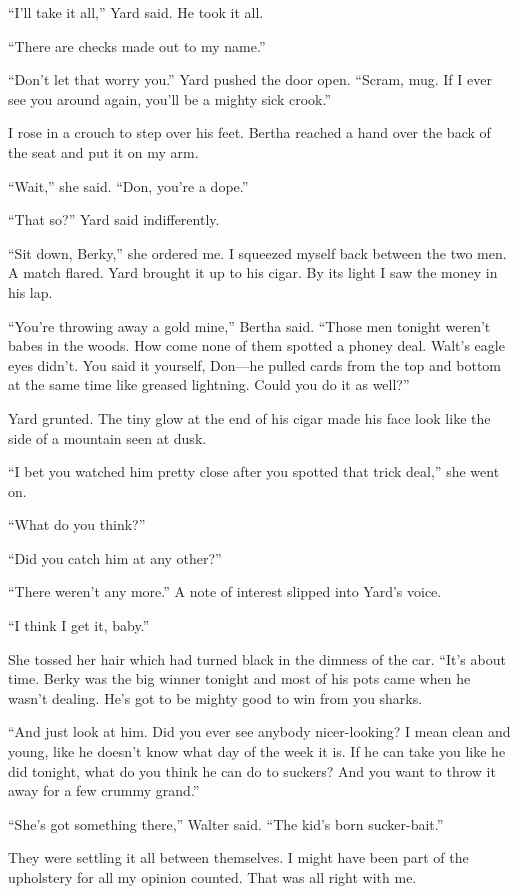 \documentclass{novel}
\begin{document}
“I’ll take it all,” Yard said. He took it all.

“There are checks made out to my name.”

“Don’t let that worry you.” Yard pushed the door open. “Scram, mug. If I ever see you around again, you’ll be a mighty sick crook.”

I rose in a crouch to step over his feet. Bertha reached a hand over the back of the seat and put it on my arm.

“Wait,” she said. “Don, you’re a dope.”

“That so?” Yard said indifferently. 

“Sit down, Berky,” she ordered me. I squeezed myself back between the two men. A match flared. Yard brought it up to his cigar. By its light I saw the money in his lap.

“You’re throwing away a gold mine,” Bertha said. “Those men tonight weren’t babes in the woods. How come none of them spotted a phoney deal. Walt’s eagle eyes didn’t. You said it yourself, Don—he pulled cards from the top and bottom at the same time like greased lightning. Could you do it as well?”

Yard grunted. The tiny glow at the end of his cigar made his face look like the side of a mountain seen at dusk.

“I bet you watched him pretty close after you spotted that trick deal,” she went on.

“What do you think?”

“Did you catch him at any other?”

“There weren’t any more.” A note of interest slipped into Yard’s voice. 

“I think I get it, baby.”

She tossed her hair which had turned black in the dimness of the car. “It’s about time. Berky was the big winner tonight and most of his pots came when he wasn’t dealing. He’s got to be mighty good to win from you sharks.

“And just look at him. Did you ever see anybody nicer-looking? I mean clean and young, like he doesn’t know what day of the week it is. If he can take you like he did tonight, what do you think he can do to suckers? And you want to throw it away for a few crummy grand.”

“She’s got something there,” Walter said. “The kid’s born sucker-bait.” 

They were settling it all between themselves. I might have been part of the upholstery for all my opinion counted. That was all right with me.
\end{document}
